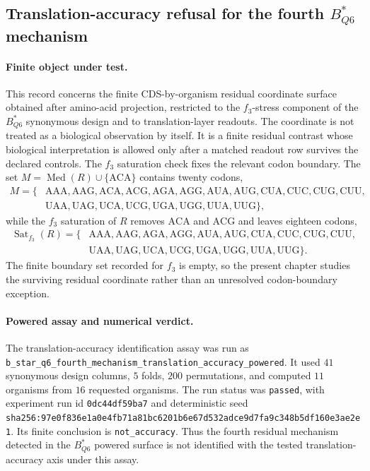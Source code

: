 \subsection{Translation-accuracy refusal for the fourth $B^{\ast}_{Q6}$ mechanism}
\label{sec:h3-cross-layer-relation-fourth-mechanism-identity-b-star-q6-translation-accuracy-powered}

\paragraph{Finite object under test.}
This record concerns the finite CDS-by-organism residual coordinate surface obtained after amino-acid projection, restricted to the $f_3$-stress component of the $B^{\ast}_{Q6}$ synonymous design and to translation-layer readouts.  The coordinate is not treated as a biological observation by itself.  It is a finite residual contrast whose biological interpretation is allowed only after a matched readout row survives the declared controls.  The $f_3$ saturation check fixes the relevant codon boundary.  The set $M=\operatorname{Med}(R)\cup\{\mathrm{ACA}\}$ contains twenty codons,
$$
\begin{aligned}
M=\{&\mathrm{AAA},\mathrm{AAG},\mathrm{ACA},\mathrm{ACG},\mathrm{AGA},\mathrm{AGG},\mathrm{AUA},\mathrm{AUG},\mathrm{CUA},\mathrm{CUC},\mathrm{CUG},\mathrm{CUU},\\
&\mathrm{UAA},\mathrm{UAG},\mathrm{UCA},\mathrm{UCG},\mathrm{UGA},\mathrm{UGG},\mathrm{UUA},\mathrm{UUG}\},
\end{aligned}
$$
while the $f_3$ saturation of $R$ removes $\mathrm{ACA}$ and $\mathrm{ACG}$ and leaves eighteen codons,
$$
\begin{aligned}
\operatorname{Sat}_{f_3}(R)=\{&\mathrm{AAA},\mathrm{AAG},\mathrm{AGA},\mathrm{AGG},\mathrm{AUA},\mathrm{AUG},\mathrm{CUA},\mathrm{CUC},\mathrm{CUG},\mathrm{CUU},\\
&\mathrm{UAA},\mathrm{UAG},\mathrm{UCA},\mathrm{UCG},\mathrm{UGA},\mathrm{UGG},\mathrm{UUA},\mathrm{UUG}\}.
\end{aligned}
$$
The finite boundary set recorded for $f_3$ is empty, so the present chapter studies the surviving residual coordinate rather than an unresolved codon-boundary exception.

\paragraph{Powered assay and numerical verdict.}
The translation-accuracy identification assay was run as \texttt{b\_star\_q6\_fourth\_mechanism\_translation\_accuracy\_powered}.  It used $41$ synonymous design columns, $5$ folds, $200$ permutations, and computed $11$ organisms from $16$ requested organisms.  The run status was \texttt{passed}, with experiment run id \texttt{0dc44df59ba7} and deterministic seed \texttt{sha256:97e0f836e1a0e4fb71a81bc6201b6e67d532adce9d7fa9c348b5df160e3ae2e1}.  Its finite conclusion is \texttt{not\_accuracy}.  Thus the fourth residual mechanism detected in the $B^{\ast}_{Q6}$ powered surface is not identified with the tested translation-accuracy axis under this assay.


